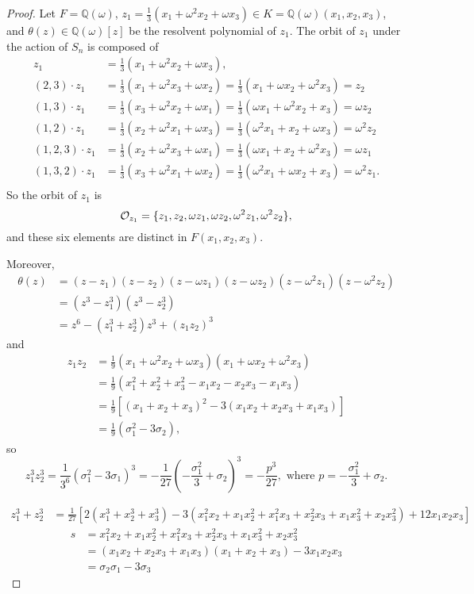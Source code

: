\documentclass[11pt,a4paper]{article}
\newcommand{\Q}{\mathbb{Q}}
\begin{document}
\begin{proof}
Let $F = \Q(\omega)$, $z_1 = \frac{1}{3}(x_1+\omega^2 x_2+\omega x_3) \in K=\Q(\omega)(x_1,x_2,x_3)$,  and $\theta(z) \in \Q(\omega)[z]$ be the resolvent polynomial of $z_1$.
The orbit of $z_1$ under the action of $S_n$ is composed of 
\begin{align*}
z_1& =\frac{1}{3}(x_1+\omega^2 x_2+\omega x_3),\\
  (2,3)\cdot z_1 &= \frac{1}{3}(x_1+\omega^2 x_3+\omega x_2) = \frac{1}{3}(x_1+\omega x_2+\omega^2 x_3)=z_2\\
  (1,3) \cdot z_1 &=\frac{1}{3}(x_3+\omega^2 x_2+\omega x_1) =  \frac{1}{3}(\omega x_1+\omega^2 x_2+ x_3) = \omega z_2\\
  (1,2) \cdot z_1 &=\frac{1}{3}(x_2+\omega^2 x_1+\omega x_3) =  \frac{1}{3}(\omega^2 x_1+ x_2+ \omega x_3) = \omega^2 z_2\\
 (1,2,3)\cdot z_1 &= \frac{1}{3}(x_2+\omega^2 x_3+\omega x_1) =  \frac{1}{3}(\omega x_1+ x_2+\omega^2 x_3) = \omega z_1\\
 (1,3,2)\cdot z_1 &= \frac{1}{3}(x_3+\omega^2 x_1+\omega x_2) =  \frac{1}{3}(\omega^2 x_1+ \omega x_2+ x_3) = \omega^2 z_1.\\
\end{align*}
So the orbit of $z_1$ is
$${\cal O}_{z_1} = \{z_1,z_2,\omega z_1,\omega z_2,\omega^2 z_1,\omega^2 z_2\},$$
and these six elements are distinct in $F(x_1,x_2,x_3)$.

Moreover,
\begin{align*}
\theta(z) &= (z-z_1)(z-z_2)(z-\omega z_1)(z-\omega z_2) (z- \omega^2 z_1)(z-\omega^2 z_2)\\
&=(z^3-z_1^3)(z^3 - z_2^3)\\
&=z^6 - (z_1^3+z_2^3)z^3 +(z_1z_2)^3
\end{align*}
and 
\begin{align*}
z_1z_2 &= \frac{1}{9}(x_1+\omega^2 x_2+\omega x_3)(x_1+\omega x_2+\omega^2 x_3)\\
&= \frac{1}{9}(x_1^2+x_2^2+x_3^2-x_1x_2-x_2x_3-x_1x_3)\\
&= \frac{1}{9}[(x_1+x_2+x_3)^2 - 3(x_1x_2+x_2x_3+x_1x_3)]\\
&=\frac{1}{9}(\sigma_1^2 - 3 \sigma_2),
\end{align*}
so 
$$z_1^3z_2^3 = \frac{1}{3^6}(\sigma_1^2-3\sigma_1)^3 = -\frac{1}{27}\left(-\frac{\sigma_1^2}{3} + \sigma_2 \right)^3 = -\frac{p^3}{27},\text{ where } p = -\frac{\sigma_1^2}{3} + \sigma_2.$$

\begin{align*}
z_1^3 + z_2^3 &= \frac{1}{27}\left[2 (x_{1}^{3} +  x_{2}^{3} +  x_{3}^{3}) - 3 (x_{1}^{2} x_{2} + x_{1} x_{2}^{2} +x_{1}^{2} x_{3} + x_{2}^{2} x_{3} + x_{1}x_{3}^{2} +x_{2} x_{3}^{2}) + 12 x_{1} x_{2} x_{3}\right]
\end{align*}
\begin{align*}
s &= x_{1}^{2} x_{2} + x_{1} x_{2}^{2} +x_{1}^{2} x_{3} + x_{2}^{2} x_{3} + x_{1}x_{3}^{2} +x_{2} x_{3}^{2}\\
&= (x_1x_2+x_2x_3+x_1x_3)(x_1+x_2+x_3)-3x_1x_2x_3\\
&= \sigma_2 \sigma_1 - 3 \sigma_3
\end{align*}


\end{proof}
\end{document}
